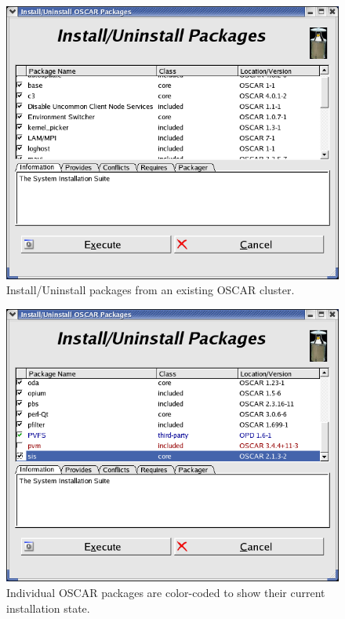 \begin{figure}[ht!]
  \begin{center}
    \centerline{\includegraphics[scale=\imgscale]{figs/sbs-pkgInUn-selector}}
    \caption[Install/Uninstall OSCAR Packages.]{Install/Uninstall packages from an existing
        OSCAR cluster.}
    \label{fig:sbs-pkgInUn-selector}
  \end{center}
\end{figure}

\begin{figure}[ht!]
  \begin{center}
    \centerline{\includegraphics[scale=\imgscale]{figs/sbs-pkgInUn-selector-example-colors}}
    \caption[Install/Uninstall OSCAR Package selector sample colors.]{Individual OSCAR packages
        are color-coded to show their current installation state.}
    \label{fig:sbs-pkgInUn-selector-example-colors}
  \end{center}
\end{figure}

